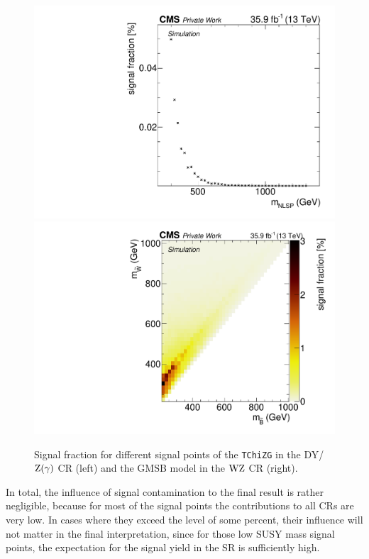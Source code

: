 \begin{figure}
 \includegraphics[width=\pairwidth]{figures/contamination/tching_DY}
 \includegraphics[width=\pairwidth]{figures/contamination/gmsb_WZ}
 \caption{Signal fraction for different signal points of the \texttt{TChiZG} in the DY/$\mathrm{Z}(\gamma)$ CR (left) and the GMSB model in the $\mathrm{W}\mathrm{Z}$ CR (right).}
 \label{fig:signalCont}
\end{figure}
In total, the influence of signal contamination to the final result is rather negligible, because for most of the signal points the contributions to all CRs are very low. In cases where they exceed the level of some percent, their influence will not matter in the final interpretation, since for those low SUSY mass signal points, the expectation for the signal yield in the SR is sufficiently high.


